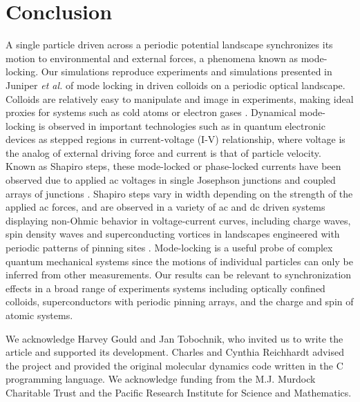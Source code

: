 \documentclass[twocolumn,preprintnumbers,amsmath,amssymb,aps,prb]{revtex4}
\begin{document}
\section{Conclusion}
\label{sec:conclusion}	
A single particle driven across a periodic potential landscape 
synchronizes its motion 
to environmental and external forces,
a phenomena known as mode-locking.  
Our simulations reproduce experiments and simulations presented in 
Juniper {\it et al.} \cite{Juniper2015, Juniper2017}
of 
mode locking in
driven colloids on a
periodic optical landscape.
Colloids are 
relatively easy to 
manipulate and image in experiments,
making ideal proxies 
for systems 
such as cold atoms or electron gases \cite{Grier2003}.
Dynamical mode-locking 
is 
observed in important technologies such as 
in quantum electronic
devices as 
stepped regions in current-voltage (I-V) relationship,
where voltage is the analog of external driving force
and current is that of particle velocity.
Known as Shapiro steps, 
these mode-locked or phase-locked currents  
have been observed due to applied ac voltages in 
single Josephson junctions \cite{Shapiro1963, Golubov2004} and
coupled arrays of junctions \cite{Benz1990}.
Shapiro steps vary in width depending on the strength of the
applied ac forces,
and are observed in a variety of ac and dc driven systems
displaying
non-Ohmic behavior in voltage-current curves,
including
charge waves, spin density waves
and superconducting vortices in landscapes 
engineered with periodic patterns of pinning sites \cite{Reichhardt2000}.
Mode-locking is a useful probe 
of complex quantum mechanical systems
since the motions of individual particles can only be inferred
from other measurements.
Our results can be relevant 
to synchronization effects
in a broad range of experiments systems
including optically confined colloids,
superconductors with periodic pinning arrays, 
and the charge and spin of atomic systems.

\begin{acknowledgments}

  We acknowledge Harvey Gould and Jan Tobochnik,
  who invited us to write the article and
  supported its development.
  Charles and Cynthia Reichhardt advised 
  the project and provided the original molecular dynamics code
  written in the C programming language.
  We acknowledge funding from the M.J. Murdock Charitable Trust
  and the Pacific Research Institute for Science and Mathematics. %

\end{acknowledgments}
\end{document}
